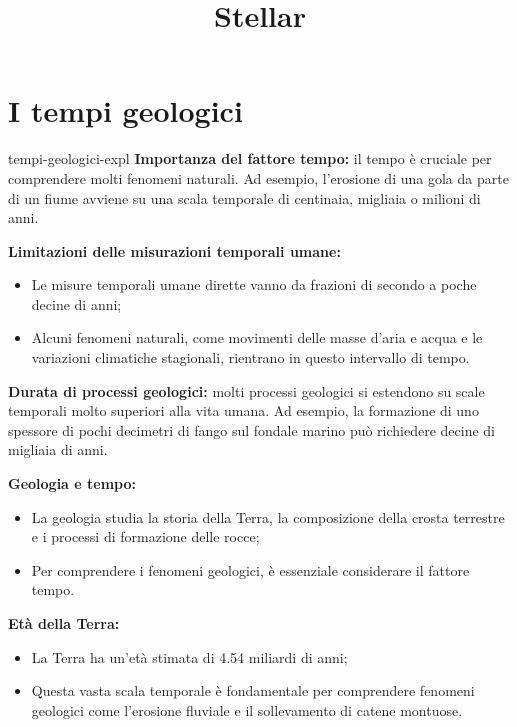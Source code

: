 \documentclass[preview]{standalone}
\begin{document}
\title{Stellar}
\genpage

\section{I tempi geologici}

\begin{snippet}{tempi-geologici-expl}
    \textbf{Importanza del fattore tempo:}
    il tempo è cruciale per comprendere molti fenomeni naturali. Ad esempio, l'erosione di una gola
    da parte di un fiume avviene su una scala temporale di centinaia, migliaia o milioni di anni.
    
    \textbf{Limitazioni delle misurazioni temporali umane:}
    \begin{itemize}
        \item Le misure temporali umane dirette vanno da frazioni di secondo a poche decine di anni;
        \item Alcuni fenomeni naturali, come movimenti delle masse d'aria e acqua e le variazioni
            climatiche stagionali, rientrano in questo intervallo di tempo.
    \end{itemize}
    
    \textbf{Durata di processi geologici:}
    molti processi geologici si estendono su scale temporali molto superiori alla vita umana.
    Ad esempio, la formazione di uno spessore di pochi decimetri di fango sul fondale marino può
    richiedere decine di migliaia di anni.
    
    \textbf{Geologia e tempo:}
    \begin{itemize}
        \item La geologia studia la storia della Terra, la composizione della crosta terrestre e i
            processi di formazione delle rocce;
        \item Per comprendere i fenomeni geologici, è essenziale considerare il fattore tempo.
    \end{itemize}
    
    \textbf{Età della Terra:}
    \begin{itemize}
        \item La Terra ha un'età stimata di 4.54 miliardi di anni;
        \item Questa vasta scala temporale è fondamentale per comprendere fenomeni geologici come
            l'erosione fluviale e il sollevamento di catene montuose.
    \end{itemize}
\end{snippet}
\end{document}
